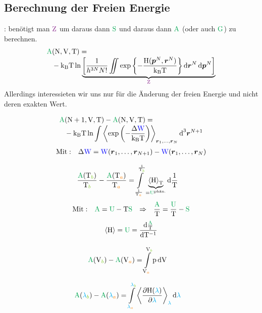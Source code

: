 \subsection*{Berechnung der Freien Energie}
\begin{sectionbox}[Vorgehen]\nospacing
  : benötigt man $\Zz$ um daraus dann $\Spot$ und daraus dann $\Apot$ (oder auch $\Gpot$) zu berechnen.
  \begin{align*}
    \Apot&(\Nz,\Vz,\Tz)=\nalign
    &-\kb\Tz\ln \underbrace{\left[\frac{1}{h^{3N}N!}\iint\exp{\left\{-\frac{\Hamkl(\vec{p}^N,\rvec^N)}{\kb\Tz}\right\}\diff\rvec^N\diff\vec{p}^N}\right]}_{\Zz}
  \end{align*}
  Allerdings interessieten wir uns nur für die Änderung der freien Energie und nicht deren exakten Wert.
\end{sectionbox}
\begin{sectionbox}\nospacing
  \begin{align}
    \Apot&(\Nz+1,\Vz,\Tz)-\Apot(\Nz,\Vz,\Tz)=\nalign
    &-\kb\Tz\ln\int\obs{\exp\left(-\frac{\Delta\Wpot}{\kb\Tz}\right)}_{\rvec_1,\ldots,\rvec_N}\diff^3\rvec^{N+1}
  \end{align}
  \begin{align*}
    &\text{Mit}:&\Delta\textcolor{blue}{\mathrm{W}}=\textcolor{blue}{\mathrm{W}}(\boldsymbol r _1,\ldots,\boldsymbol r _{N+1})-\textcolor{blue}{\mathrm{W}}(\boldsymbol r _1,\ldots,\boldsymbol r _N)
  \end{align*}
\end{sectionbox}
\begin{sectionbox}\nospacing
  \begin{align}
    &\frac{\Apot(\Tz_{\mcb})}{\Tz_{\mcb}}-\frac{\Apot(\Tz_{\mca})}{\Tz_{\mca}}=
    \int\limits_{\frac{1}{\Tz_{\mca}}}^{\frac{1}{\Tz_{\mcb}}}\underbrace{\obs{\Hamkl}_{\Tz}}_{=\Upot^{\text{phän.}}}\diff \frac{1}{\Tz}
  \end{align}
  \begin{align*}
    &\text{Mit}:&\Apot=\Upot-\Tz\Spot&&\Rightarrow&&\frac{\Apot}{\Tz}=\frac{\Upot}{\Tz}-\Spot
  \end{align*}
  \begin{align*}
    \obs{\Hamkl}=\Upot=\frac{\diff \frac{\Apot}{\Tz}}{\diff \Tz^{-1}}
  \end{align*}
\end{sectionbox}
\begin{sectionbox}\nospacing
  \begin{align}
    &\Apot(\Vz_{\mcb})-\Apot(\Vz_{\mca})=
      \int\limits_{\Vz_{\mca}}^{\Vz_{\mcb}}\pz\diff\Vz
  \end{align}
\end{sectionbox}
\begin{sectionbox}\nospacing
  \begin{align}
    &\Apot(\lambdac_{\mcb})-\Apot(\lambdac_{\mca})=
      \int\limits_{\lambdac_{\mca}}^{\lambdac_{\mcb}}\obs{\pfrac{\Hamkl(\lambdac)}{\lambdac}}_{\lambdac}\diff\lambdac
  \end{align}
\end{sectionbox}

